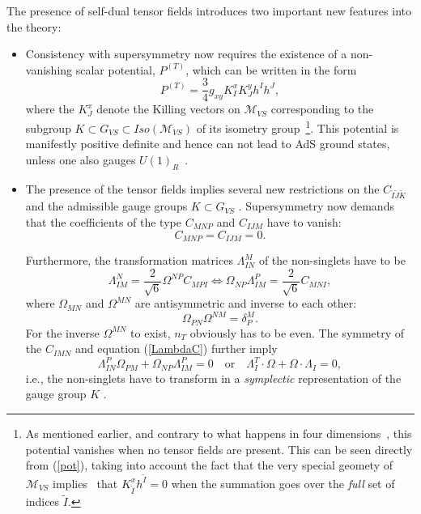 \documentclass[a4paper,11pt]{article}
\newcommand{\ti}{\ensuremath{\tilde{I}}}
\newcommand{\tj}{\ensuremath{\tilde{J}}}
\newcommand{\tk}{\ensuremath{\tilde{K}}}
\newcommand{\M}{\ensuremath{\mathcal{M}}}
\begin{document}
The presence of self-dual tensor fields introduces two important
new features into the theory:
\begin{itemize}

\item Consistency with supersymmetry now requires the existence
of a non-vanishing
scalar potential, $P^{(T)}$, which can be written in the form~\cite{GZ1}
\begin{equation}\label{pot}
P^{(T)}=\frac{3}{4}g_{xy}K^{x}_I K^{y}_J h^I h^J,
\end{equation}
where the $K_J^x$ denote the Killing vectors on $\M_{VS}$ corresponding to the subgroup 
$K\subset G_{VS}\subset Iso(\M_{VS})$ of its isometry group~\footnote{As mentioned 
earlier, and contrary to what happens in four dimensions~\cite{dWvP0,ABCDFF}, this 
potential vanishes when no tensor fields are present. This can be seen directly from 
(\ref{pot}), taking into account the fact that the very special geomety of $\M_{VS}$ 
implies~\cite{GST2} that $ K^{x}_{\ti}  h^{\ti}=0$ when the summation goes over the 
\emph{full} set of indices $\ti$.}. This potential is manifestly positive definite and 
hence  can not lead to AdS ground states, unless one also gauges $U(1)_R$~\cite{GZ2}.

\item The presence of the tensor fields
implies  several new restrictions on the $C_{\ti\tj\tk}$ and the
admissible gauge groups $K\subset G_{VS}$ \cite{GZ1}.
Supersymmetry now demands that the
coefficients of the type $C_{MNP}$ and $ C_{IJM}$ have to vanish:
\begin{equation}\label{vanishingC}
C_{MNP}= C_{IJM}=0.
\end{equation}

Furthermore, the transformation matrices $\Lambda^M_{IN}$ of the
non-singlets have to be
\begin{equation}\label{LambdaC}
\Lambda^N_{IM}=\frac{2}{\sqrt{6}}\Omega^{NP}C_{MPI}\Longleftrightarrow
\Omega_{NP}\Lambda^{P}_{IM}=\frac{2}{\sqrt{6}}C_{MNI},
\end{equation}
where $\Omega_{MN}$ and $\Omega^{MN}$ are antisymmetric and
inverse to each other:
\begin{displaymath}
\Omega_{PN} \Omega^{NM}=\delta_{P}^{M}.
\end{displaymath}
For the inverse $\Omega^{MN}$ to exist, $n_{T}$ obviously has to
be even. The symmetry of the $C_{IMN}$ and equation (\ref{LambdaC})
further imply
\begin{equation}\label{Lambdasymplectic}
\Lambda^{P}_{IN}\Omega_{PM} +\Omega_{NP}\Lambda^{P}_{IM}=0 \quad
\textrm{or} \quad \Lambda_I^T\cdot\Omega + \Omega\cdot
\Lambda_I=0,
\end{equation}
i.e., the non-singlets have to transform in a \emph{symplectic}
representation of the gauge group $K$ \cite{GZ1}.
\end{itemize}
\end{document}
